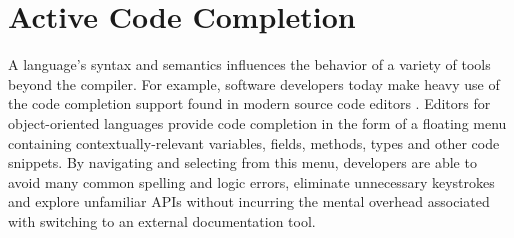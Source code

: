 \section{Active Code Completion}\label{acc}
A language's syntax and semantics influences the behavior of a variety of tools beyond the compiler. For example, software developers today make heavy use of the code completion support found in modern source code editors  \cite{murphy_how_2006}. Editors for object-oriented languages provide code completion in the form of a floating menu containing  contextually-relevant variables, fields, methods, types and other code snippets. By navigating and selecting from this menu, developers are able to avoid many common spelling and logic errors, eliminate unnecessary keystrokes and explore unfamiliar APIs without incurring the mental overhead associated with switching to an external documentation tool.


